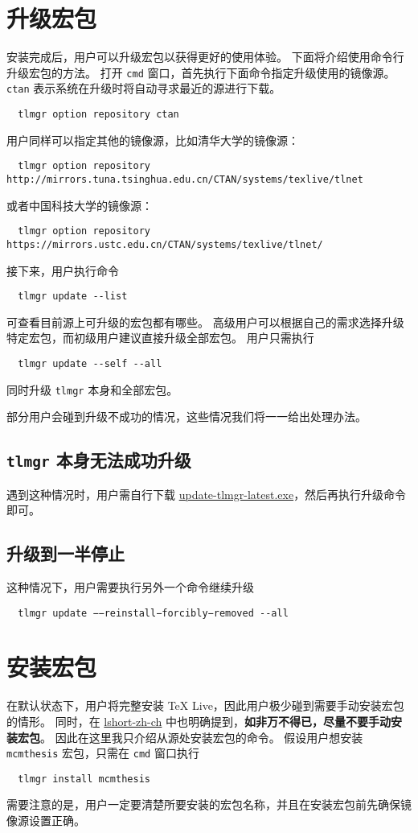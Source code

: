\documentclass{ctexart}
\begin{document}
\section{升级宏包}
安装完成后，用户可以升级宏包以获得更好的使用体验。
下面将介绍使用命令行升级宏包的方法。
打开 \texttt{cmd} 窗口，首先执行下面命令指定升级使用的镜像源。
\texttt{ctan} 表示系统在升级时将自动寻求最近的源进行下载。
\begin{lstlisting}
  tlmgr option repository ctan
\end{lstlisting}
用户同样可以指定其他的镜像源，比如清华大学的镜像源：
\begin{lstlisting}
  tlmgr option repository http://mirrors.tuna.tsinghua.edu.cn/CTAN/systems/texlive/tlnet
\end{lstlisting}
或者中国科技大学的镜像源：
\begin{lstlisting}
  tlmgr option repository https://mirrors.ustc.edu.cn/CTAN/systems/texlive/tlnet/
\end{lstlisting}
接下来，用户执行命令
\begin{lstlisting}
  tlmgr update --list
\end{lstlisting}
可查看目前源上可升级的宏包都有哪些。
高级用户可以根据自己的需求选择升级特定宏包，而初级用户建议直接升级全部宏包。
用户只需执行
\begin{lstlisting}
  tlmgr update --self --all
\end{lstlisting}
同时升级 \texttt{tlmgr} 本身和全部宏包。

部分用户会碰到升级不成功的情况，这些情况我们将一一给出处理办法。

\subsection{\texttt{tlmgr} 本身无法成功升级}

遇到这种情况时，用户需自行下载 \href{http://mirror.ctan.org/systems/texlive/tlnet/update-tlmgr-latest.exe}{update-tlmgr-latest.exe}，然后再执行升级命令即可。

\subsection{升级到一半停止}

这种情况下，用户需要执行另外一个命令继续升级
\begin{lstlisting}
  tlmgr update −−reinstall−forcibly−removed --all
\end{lstlisting}

\section{安装宏包}
在默认状态下，用户将完整安装 \TeX{} Live，因此用户极少碰到需要手动安装宏包的情形。
同时，在 \href{http://mirrors.ctan.org/info/lshort/chinese/lshort-zh-cn.pdf}{lshort-zh-ch} 中也明确提到，\textbf{如非万不得已，尽量不要手动安装宏包}。
因此在这里我只介绍从源处安装宏包的命令。
假设用户想安装 \texttt{mcmthesis} 宏包，只需在 \texttt{cmd} 窗口执行
\begin{lstlisting}
  tlmgr install mcmthesis
\end{lstlisting}
需要注意的是，用户一定要清楚所要安装的宏包名称，并且在安装宏包前先确保镜像源设置正确。
\end{document}

